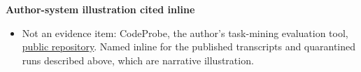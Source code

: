 \textbf{Author-system illustration cited inline}

\begin{itemize}
\tightlist
\item
  Not an evidence item: CodeProbe, the author's task-mining evaluation tool, \href{https://github.com/sjarmak/codeprobe}{public repository}. Named inline for the published transcripts and quarantined runs described above, which are narrative illustration.
\end{itemize}
